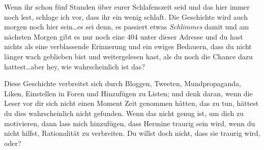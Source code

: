 \begin{chapterOpeningAuthorNote}
Wenn ihr schon fünf Stunden über eurer Schlafenszeit seid und das hier immer noch lest, schlage ich vor, dass ihr ein wenig schlaft. Die Geschichte wird auch morgen noch hier sein…es sei denn, es passiert etwas \emph{Schlimmes} damit und am nächsten Morgen gibt es nur noch eine 404 unter dieser Adresse und du hast nichts als eine verblassende Erinnerung und ein ewiges Bedauern, dass du nicht länger wach geblieben bist und weitergelesen hast, als du noch die Chance dazu hattest…aber hey, wie wahrscheinlich ist das?

Diese Geschichte verbreitet sich durch Bloggen, Tweeten, Mundpropaganda, Liken, Einstellen in Foren und Hinzufügen zu Listen; und denk daran, wenn die Leser vor dir sich nicht einen Moment Zeit genommen hätten, das zu tun, hättest du dies wahrscheinlich nicht gefunden. Wenn das nicht genug ist, um dich zu motivieren, dann lass mich hinzufügen, dass Hermine traurig sein wird, wenn du nicht hilfst, Rationalität zu verbreiten. Du willst doch nicht, dass sie traurig wird, oder?


\end{chapterOpeningAuthorNote}
